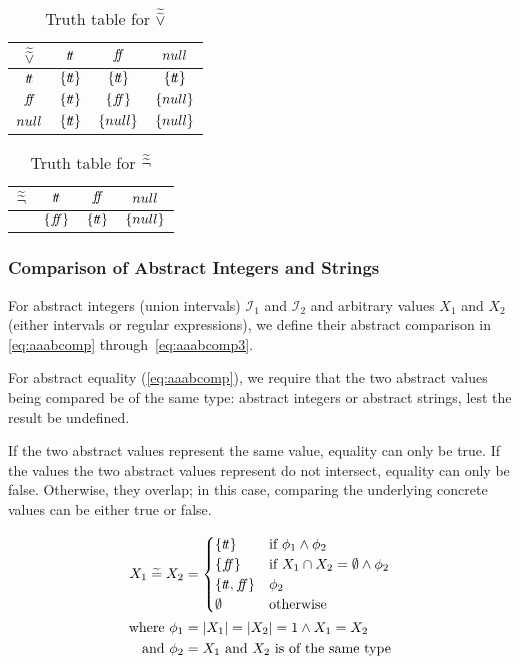 \begin{table}[H]
    \centering
    \caption{Truth table for $\widetilde{\widetilde{\lor}}$}
    \begin{tabular}{c|ccc}
        $\widetilde{\widetilde{\lor}}$ & $t\!t$ & $f\!\!f$ & $null$ \\
        \hline
        $t\!t$ & $\{t\!t\}$ & $\{t\!t\}$ & $\{t\!t\}$ \\
        $f\!\!f$ & $\{t\!t\}$ & $\{f\!\!f\}$ & $\{null\}$ \\
        $null$ & $\{t\!t\}$ & $\{null\}$ & $\{null\}$ \\
    \end{tabular}
    \label{tab:aaablor}
\end{table}

\begin{table}[H]
    \centering
    \caption{Truth table for $\widetilde{\widetilde{\neg}}$}
    \begin{tabular}{c|ccc}
        $\widetilde{\widetilde{\neg}}$ & $t\!t$ & $f\!\!f$ & $null$ \\
        \hline
        & $\{f\!\!f\}$ & $\{t\!t\}$ & $\{null\}$ \\
    \end{tabular}
    \label{tab:aaabneg}
\end{table}

\subsubsection{Comparison of Abstract Integers and Strings}\label{subsubsec:abstract-comparison}
For abstract integers (union intervals) $\mathscr{I}_1$ and $\mathscr{I}_2$ and arbitrary values $X_1$ and $X_2$ (either intervals or regular expressions), we define their abstract comparison in \autoref{eq:aaabcomp} through~\ref{eq:aaabcomp3}.

For abstract equality (\autoref{eq:aaabcomp}), we require that the two abstract values being compared be of the same type: abstract integers or abstract strings, lest the result be undefined.

If the two abstract values represent the same value, equality can only be true.
If the values the two abstract values represent do not intersect, equality can only be false.
Otherwise, they overlap; in this case, comparing the underlying concrete values can be either true or false.

\begin{align}
    X_1 \;\aab{=}\; X_2 &= \begin{cases}
        \{\true\} & \text{if } \phi_1 \land \phi_2 \\
        \{\false\} & \text{if } X_1 \cap X_2 = \emptyset \land \phi_2 \\
        \{\true, \false\} & \phi_2 \\
        \emptyset & \text{otherwise}
    \end{cases} \label{eq:aaabcomp}\\
    \text{where } \phi_1&= |X_1| = |X_2| = 1 \land X_1 = X_2 \nonumber\\
    \text{and } \phi_2&=X_1 \text{ and } X_2 \text{ is of the same type} \nonumber
\end{align}

